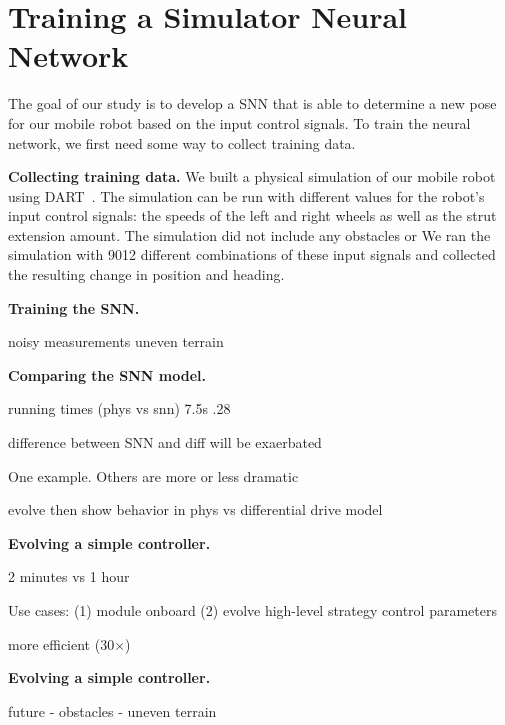 
\section{Training a Simulator Neural Network}

The goal of our study is to develop a SNN that is able to determine a new pose for our mobile robot based on the input control signals. To train the neural network, we first need some way to collect training data.

\noindent
\textbf{Collecting training data.}
%
We built a physical simulation of our mobile robot using DART~\citep{Lee.2018.JOSS.DARTDynamicAnimation}.
%
The simulation can be run with different values for the robot's input control signals: the speeds of the left and right wheels as well as the strut extension amount. The simulation did not include any obstacles or
%
We ran the simulation with 9012 different combinations of these input signals and collected the resulting change in position and heading.

\noindent
\textbf{Training the SNN.}




noisy measurements
uneven terrain





\noindent
\textbf{Comparing the SNN model.}

running times (phys vs snn)
7.5s
.28


difference between SNN and diff will be exaerbated


One example. Others are more or less dramatic

evolve then show behavior in phys vs differential drive model






\noindent
\textbf{Evolving a simple controller.}

2 minutes vs 1 hour


Use cases:
(1) module onboard
(2) evolve high-level strategy control parameters

\citet{Pretorius.2014.2ICECC.ComparisonNeuralNetworks}
more efficient (30$\times$)

\noindent
\textbf{Evolving a simple controller.}



future
- obstacles
- uneven terrain
